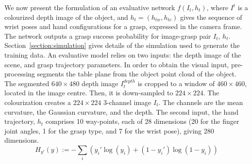 We now present the formulation of an evaluative network $f(I_t, h_t)$, where $I^t$ is a colourized depth image of the object, and $h_t = (h_{tw}, h_{tc})$ gives the sequence of wrist poses and hand configurations for a grasp, expressed in the camera frame. The network outputs a grasp success probability for image-grasp pair $I_t$, $h_t$. Section~\ref{section:simulation} gives details of the simulation used to generate the training data.
An evaluative model relies on two inputs: the depth image of the scene, and grasp trajectory parameters. In order to obtain the visual input, pre-processing segments the table plane from the object point cloud of the object. The segmented $640 \times 480$ depth image $I_{t}^{depth}$ is cropped to a window of $460 \times 460$, located in the image centre. Then, it is down-sampled to $224 \times 224$. The colourization creates a $224 \times 224$ 3-channel image $I_t$. The channels  are the mean curvature, the Gaussian curvature, and the depth. The second input, the hand trajectory, $h_t$ comprises 10 way-points, each of 28 dimensions (20 for the finger joint angles, 1 for the grasp type, and 7 for the wrist pose), giving 280 dimensions. %
\begin{equation}
H_{y'}(y) := - \sum_{i} ({y_i' \log(y_i) + (1-y_i') \log (1-y_i)})
\label{equation:crossentropy}
\end{equation}
